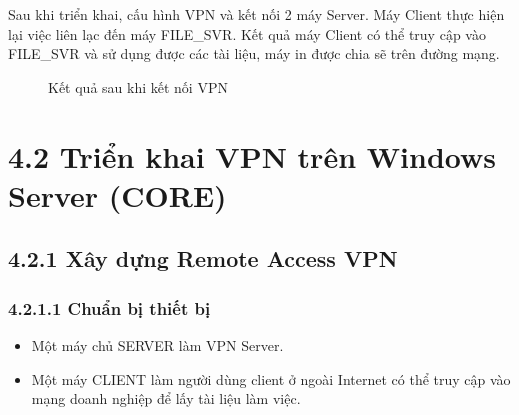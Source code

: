   Sau khi triển khai, cấu hình VPN và kết nối 2 máy Server. Máy Client thực hiện lại việc liên lạc đến máy FILE\_SVR. Kết quả máy Client có thể truy cập vào FILE\_SVR và sử dụng được các tài liệu, máy in được chia sẽ trên đường mạng.

    \begin{figure}[htbp]
            \hfill
            \hfill
            \caption{Kết quả sau khi kết nối VPN}
        \end{figure}
 \section*{4.2 Triển khai VPN trên Windows Server (CORE)}


 \subsection*{4.2.1 Xây dựng Remote Access VPN}
 \subsubsection*{4.2.1.1 Chuẩn bị thiết bị}

  \begin{itemize}
     \item Một máy chủ SERVER làm VPN Server.
     \item Một máy CLIENT làm người dùng client ở ngoài Internet có thể truy cập vào mạng doanh nghiệp để lấy tài liệu làm việc.
 \end{itemize}

